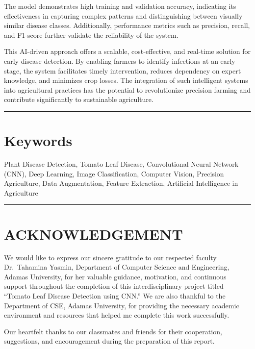 \documentclass[
]{article}
\begin{document}
The model demonstrates high training and validation accuracy, indicating
its effectiveness in capturing complex patterns and distinguishing
between visually similar disease classes. Additionally, performance
metrics such as precision, recall, and F1-score further validate the
reliability of the system.

This AI-driven approach offers a scalable, cost-effective, and real-time
solution for early disease detection. By enabling farmers to identify
infections at an early stage, the system facilitates timely
intervention, reduces dependency on expert knowledge, and minimizes crop
losses. The integration of such intelligent systems into agricultural
practices has the potential to revolutionize precision farming and
contribute significantly to sustainable agriculture.

\begin{center}\rule{0.5\linewidth}{0.5pt}\end{center}

\section{Keywords}\label{keywords}

Plant Disease Detection, Tomato Leaf Disease, Convolutional Neural
Network (CNN), Deep Learning, Image Classification, Computer Vision,
Precision Agriculture, Data Augmentation, Feature Extraction, Artificial
Intelligence in Agriculture

\begin{center}\rule{0.5\linewidth}{0.5pt}\end{center}

\section{ACKNOWLEDGEMENT}\label{acknowledgement}

We would like to express our sincere gratitude to our respected faculty
Dr.~Tahamina Yasmin, Department of Computer Science and Engineering,
Adamas University, for her valuable guidance, motivation, and continuous
support throughout the completion of this interdisciplinary project
titled ``Tomato Leaf Disease Detection using CNN.'' We are also thankful
to the Department of CSE, Adamas University, for providing the necessary
academic environment and resources that helped me complete this work
successfully.

Our heartfelt thanks to our classmates and friends for their
cooperation, suggestions, and encouragement during the preparation of
this report.
\end{document}
